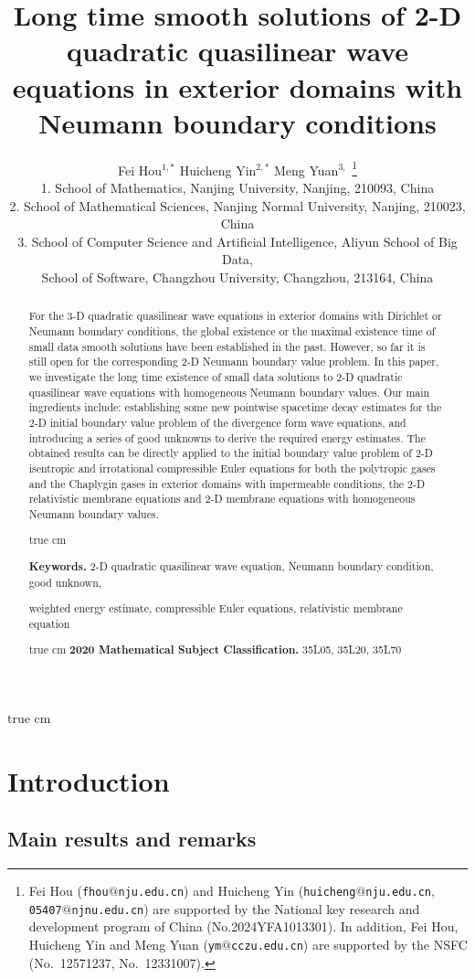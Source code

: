 \documentclass[11pt,twoside]{article}
\title{Long time smooth solutions of 2-D quadratic quasilinear wave equations in exterior domains with Neumann boundary conditions}
\author{Fei Hou$^{1,*}$ \quad Huicheng Yin$^{2,*}$ \quad Meng Yuan$^{3,}$
    \footnote{Fei Hou (\texttt{fhou$@$nju.edu.cn}) and Huicheng Yin (\texttt{huicheng$@$nju.edu.cn}, \texttt{05407$@$njnu.edu.cn})
    are supported by the National key research and development program of China (No.2024YFA1013301).
    In addition, Fei Hou, Huicheng Yin and Meng Yuan (\texttt{ym$@$cczu.edu.cn}) are supported by the NSFC (No.~12571237, No.~12331007).}\\
    [12pt]{\small 1. School of Mathematics, Nanjing University, Nanjing, 210093, China}\\
    {\small 2. School of Mathematical Sciences, Nanjing Normal University, Nanjing, 210023, China}\\
    {\small 3. School of Computer Science and Artificial Intelligence, Aliyun School of Big Data,}\\
    {\small School of Software, Changzhou University, Changzhou, 213164, China}}
\theoremstyle{plain}
\theoremstyle{definition}
\numberwithin{equation}{section}
\begin{document}
\date{}
\maketitle
\thispagestyle{empty}

\begin{abstract}
For the 3-D quadratic quasilinear wave equations in exterior domains with Dirichlet or Neumann boundary conditions,
the global existence or the maximal existence time of small data smooth solutions have been established in the past.
However, so far it is still open for the corresponding 2-D Neumann boundary value problem.
In this paper, we investigate the long time existence of small data solutions to 2-D quadratic
quasilinear wave equations with homogeneous Neumann boundary values.
Our main ingredients include: establishing some new pointwise spacetime decay estimates for the 2-D initial boundary value
problem of the divergence form wave equations, and introducing a series of good unknowns to derive the required energy estimates.
The obtained results can be directly applied to the initial boundary value problem of 2-D isentropic and
irrotational compressible Euler equations
for both the polytropic gases and the Chaplygin gases in exterior domains with impermeable conditions,
the 2-D relativistic membrane equations and  2-D membrane equations with  homogeneous Neumann boundary values.

 true cm

\noindent
\textbf{Keywords.} 2-D quadratic quasilinear wave equation, Neumann boundary condition,  good unknown,

\qquad\quad   weighted energy estimate, compressible Euler equations, relativistic membrane equation

 true cm
\noindent
\textbf{2020 Mathematical Subject Classification.}  35L05, 35L20, 35L70
\end{abstract}

 true cm

\tableofcontents


\section{Introduction}

\subsection{Main results and remarks}
\end{document}

